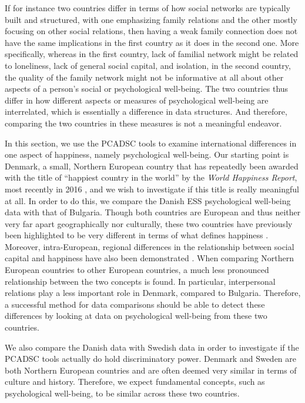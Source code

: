 \documentclass[a4paper,12pt]{article}
\begin{document}
If for instance two countries differ in terms of how social networks are typically built and structured, with one emphasizing family relations and the other mostly focusing on other social relations, then having a weak family connection does not have the same implications in the first country as it does in the second one. More specifically, whereas in the first country, lack of familial network might be related to loneliness, lack of general social capital, and isolation, in the second country, the quality of the family network might not be informative at all about other aspects of a person's social or psychological well-being. The two countries thus differ in how different aspects or measures of psychological well-being are interrelated, which is essentially a difference in data structures. And therefore, comparing the two countries in these measures is not a meaningful endeavor.

In this section, we use the PCADSC tools to examine international differences in one aspect of happiness, namely psychological well-being. Our starting point is Denmark, a small, Northern European country that has repeatedly been awarded with the title of ``happiest country in the world''  by the \textit{World Happiness Report}, most recently in 2016 \cite{WHR2016}, and we wish to investigate if this title is really meaningful at all. In order to do this, we compare the Danish ESS psychological well-being data with that of Bulgaria. Though both countries are European and thus neither very far apart geographically nor culturally, these two countries have previously been highlighted to be very different in terms of what defines happiness \cite{ESStopline5}. Moreover, intra-European, regional differences in the relationship between social capital and happiness have also been demonstrated \cite{Rodriguez2014}. When comparing Northern European countries to other European countries, a much less pronounced relationship between the two concepts is found. In particular, interpersonal relations play a less important role in Denmark, compared to Bulgaria. Therefore, a successful method for data comparisons should be able to detect these differences by looking at data on psychological well-being from these two countries.

We also compare the Danish data with Swedish data in order to investigate if the PCADSC tools actually do hold discriminatory power. Denmark and Sweden are both Northern European countries and are often deemed very similar in terms of culture and history. Therefore, we expect fundamental concepts, such as psychological well-being, to be similar across these two countries.
\end{document}
